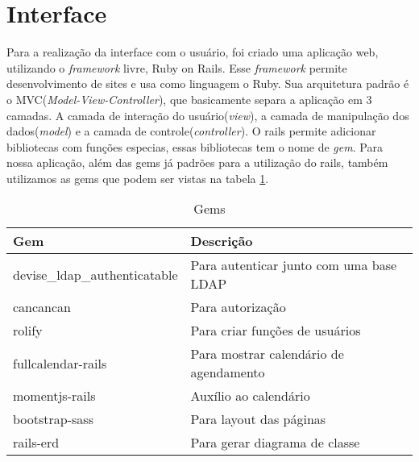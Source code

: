 \section{Interface} %
\label{sub:interface}
  Para a realização da interface com o usuário, foi criado uma aplicação web, utilizando o \textit{framework} livre, Ruby on Rails\cite{rails}.
Esse \textit{framework} permite desenvolvimento de sites e usa como linguagem o Ruby. Sua arquitetura padrão é o MVC(\textit{Model-View-Controller}),
 que basicamente separa a aplicação em 3 camadas. A camada de interação do usuário(\textit{view}), a camada de manipulação dos dados(\textit{model}) 
e a camada de controle(\textit{controller})\cite{mvc}.
  O rails permite adicionar bibliotecas com funções especias, essas bibliotecas tem o nome de \textit{gem}. Para nossa aplicação, além das gems já padrões para a utilização
  do rails, também utilizamos as gems que podem ser vistas na tabela \ref{gems}.
\begin{table}[H]
\centering
\caption{Gems}
\label{gems}
\begin{tabular}{|l|l|}
\hline
\rowcolor[HTML]{C0C0C0} 
{\color[HTML]{333333} \textbf{Gem}} & {\color[HTML]{333333} \textbf{Descrição}} \\ \hline
devise\_ldap\_authenticatable       & Para autenticar junto com uma base LDAP   \\ \hline
cancancan                           & Para autorização                          \\ \hline
rolify                              & Para criar funções de usuários            \\ \hline
fullcalendar-rails                  & Para mostrar calendário de agendamento    \\ \hline
momentjs-rails                      & Auxílio ao calendário                     \\ \hline
bootstrap-sass                      & Para layout das páginas                   \\ \hline
rails-erd                           & Para gerar diagrama de classe             \\ \hline
\end{tabular}
\end{table}

